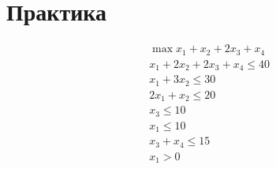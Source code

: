 \section{Практика}
\begin{eqnarray}
&\max x_1 + x_2 + 2x_3 + x_4\\
&x_1+2x_2+2x_3+x_4 \leq 40\\
&x_1+3x_2 \leq 30\\
&2x_1+x_2 \leq 20\\
&x_3 \leq 10\\
&x_1 \leq 10\\
&x_3+x_4 \leq 15\\
&x_1>0
\end{eqnarray}
